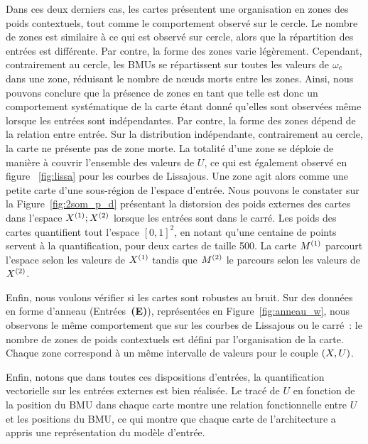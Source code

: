 \documentclass[../main]{subfiles}
\begin{document}
Dans ces deux derniers cas, les cartes présentent une organisation en zones des poids contextuels, tout comme le comportement observé sur le cercle. Le nombre de zones est similaire à ce qui est observé sur cercle, alors que la répartition des entrées est différente. Par contre, la forme des zones varie légèrement.
Cependant, contrairement au cercle, les BMUs se répartissent sur toutes les valeurs de $\omega_c$ dans une zone, réduisant le nombre de n\oe{}uds morts entre les zones.
Ainsi, nous pouvons conclure que la présence de zones en tant que telle est donc un comportement systématique de la carte étant donné qu'elles sont observées même lorsque les entrées sont indépendantes. Par contre, la forme des zones dépend de la relation entre entrée.
Sur la distribution indépendante, contrairement au cercle, la carte ne présente pas de zone morte. La totalité d'une zone se déploie de manière à couvrir l'ensemble des valeurs de $U$, ce qui est également observé en figure ~\ref{fig:lissa} pour les courbes de Lissajous.
Une zone agit alors comme une petite carte d'une sous-région de l'espace d'entrée. 
Nous pouvons le constater sur la Figure~\ref{fig:2som_p_d} présentant la distorsion des poids externes des cartes dans l'espace $X^{({1})}; X^{({2})}$ lorsque les entrées sont dans le carré. Les poids des cartes quantifient tout l'espace $[0,1]^2$, en notant qu'une centaine de points servent à la quantification, pour deux cartes de taille 500. La carte $M^{({1})}$ parcourt l'espace selon les valeurs de $X^{({1})}$ tandis que $M^{({2})}$ le parcours selon les valeurs de$X^{({2})}$.

Enfin, nous voulons vérifier si les cartes sont robustes au bruit. Sur des données en forme d'anneau (Entrées~\textbf{(E)}), représentées en Figure~\ref{fig:anneau_w}, nous observons le même comportement que sur les courbes de Lissajous ou le carré~: le nombre de zones de poids contextuels est défini par l'organisation de la carte. Chaque zone correspond à un même intervalle de valeurs pour le couple $(X, U)$.

Enfin, notons que dans toutes ces dispositions d'entrées, la quantification vectorielle sur les entrées externes est bien réalisée. Le tracé de $U$ en fonction de la position du BMU dans chaque carte montre une relation fonctionnelle entre $U$ et les positions du BMU, ce qui montre que chaque carte de l'architecture a appris une représentation du modèle d'entrée.
\end{document}

